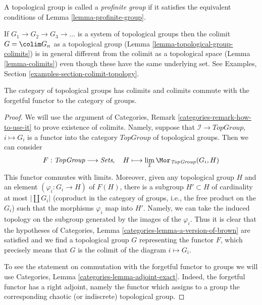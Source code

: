 \begin{definition}
\label{definition-profinite-group}
A topological group is called a {\it profinite group} if it satisfies
the equivalent conditions of Lemma \ref{lemma-profinite-group}.
\end{definition}

\noindent
If $G_1 \to G_2 \to G_3 \to \ldots$ is a system of topological groups
then the colimit $G = \colim G_n$ as a topological group
(Lemma \ref{lemma-topological-group-colimits}) is in general different
from the colimit as a topological space (Lemma \ref{lemma-colimits})
even though these have the same underlying set. See
Examples, Section \ref{examples-section-colimit-topology}.

\begin{lemma}
\label{lemma-topological-group-colimits}
The category of topological groups has colimits and colimits commute
with the forgetful functor to the category of groups.
\end{lemma}

\begin{proof}
We will use the argument of
Categories, Remark \ref{categories-remark-how-to-use-it} to prove
existence of colimits. Namely, suppose
that $\mathcal{I} \to \textit{TopGroup}$, $i \mapsto G_i$ is a functor
into the category $\textit{TopGroup}$ of topological groups.
Then we can consider
$$
F : \textit{TopGroup} \longrightarrow \textit{Sets},\quad
H \longmapsto \lim_\mathcal{I} \Mor_{\textit{TopGroup}}(G_i, H)
$$
This functor commutes with limits. Moreover, given any topological group
$H$ and an element $(\varphi_i : G_i \to H)$ of $F(H)$, there is
a subgroup $H' \subset H$ of cardinality at most $|\coprod G_i|$
(coproduct in the category of groups, i.e., the free product on the $G_i$)
such that the morphisms $\varphi_i$ map into $H'$. Namely, we can
take the induced topology on the subgroup generated by the images
of the $\varphi_i$. Thus it is clear that the hypotheses of
Categories, Lemma \ref{categories-lemma-a-version-of-brown}
are satisfied and we find a topological group $G$
representing the functor $F$, which precisely means that $G$ is
the colimit of the diagram $i \mapsto G_i$.

\medskip\noindent
To see the statement on commutation with the forgetful functor to
groups we will use
Categories, Lemma \ref{categories-lemma-adjoint-exact}.
Indeed, the forgetful functor has a right adjoint, namely the functor which
assigns to a group the corresponding chaotic (or indiscrete) topological group.
\end{proof}

